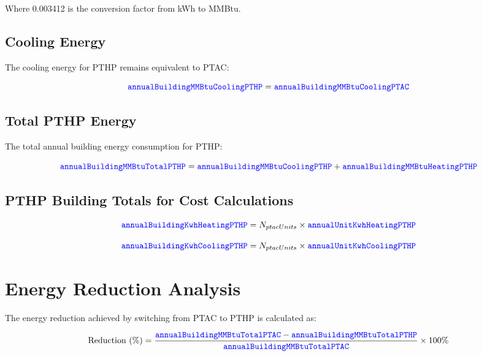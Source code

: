 \documentclass{article}
\newcommand{\code}[1]{\textcolor{blue}{\texttt{#1}}}
\begin{document}
Where 0.003412 is the conversion factor from kWh to MMBtu.

\subsection{Cooling Energy}

The cooling energy for PTHP remains equivalent to PTAC:

\begin{equation}
\code{annualBuildingMMBtuCoolingPTHP} = \code{annualBuildingMMBtuCoolingPTAC}
\end{equation}

\subsection{Total PTHP Energy}

The total annual building energy consumption for PTHP:

\begin{equation}
\code{annualBuildingMMBtuTotalPTHP} = \code{annualBuildingMMBtuCoolingPTHP} + \code{annualBuildingMMBtuHeatingPTHP}
\end{equation}

\subsection{PTHP Building Totals for Cost Calculations}

\begin{equation}
\code{annualBuildingKwhHeatingPTHP} = N_{ptacUnits} \times \code{annualUnitKwhHeatingPTHP}
\end{equation}

\begin{equation}
\code{annualBuildingKwhCoolingPTHP} = N_{ptacUnits} \times \code{annualUnitKwhCoolingPTHP}
\end{equation}

\section{Energy Reduction Analysis}

The energy reduction achieved by switching from PTAC to PTHP is calculated as:

\begin{equation}
\text{Reduction (\%)} = \frac{\code{annualBuildingMMBtuTotalPTAC} - \code{annualBuildingMMBtuTotalPTHP}}{\code{annualBuildingMMBtuTotalPTAC}} \times 100\%
\end{equation}
\end{document}
